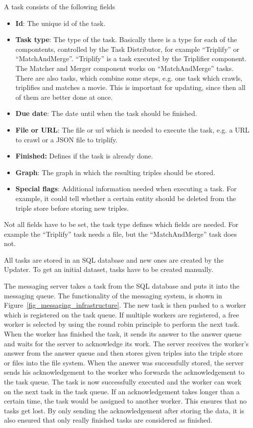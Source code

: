 A task consists of the following fields
\begin{itemize}
  \item \textbf{Id}:
  The unique id of the task.
  \item \textbf{Task type}:
   The type of the task.
  Basically there is a type for each of the compontents, controlled by the Task Distributor, for example ``Triplify'' or ``MatchAndMerge''.
  ``Triplify'' is a task executed by the Triplifier component.
  The Matcher and Merger component works on ``MatchAndMerge'' tasks.
  There are also tasks, which combine some steps, e.g. one task which crawls, triplifies and matches a movie. This is important for updating, since then all of them are better done at once.
  \item \textbf{Due date}:
  The date until when the task should be finished.
  \item \textbf{File or URL}:
  The file or url which is needed to execute the task, e.g. a URL to crawl or a JSON file to triplify.
  \item \textbf{Finished:}
  Defines if the task is already done.
  \item \textbf{Graph}:
  The graph in which the resulting triples should be stored.
  \item \textbf{Special flags}:
  Additional information needed when executing a task.
  For example, it could tell whether a certain entity should be deleted from the triple store before storing new triples.
\end{itemize}
Not all fields have to be set, the task type defines which fields are needed.
For example the ``Triplify'' task needs a file, but the ``MatchAndMerge'' task does not.

All tasks are stored in an SQL database and new ones are created by the Updater.
To get an initial dataset, tasks have to be created manually.

The messaging server takes a task from the SQL database and puts it into the messaging queue.
The functionality of the messaging system, is shown in Figure~\ref{fig_messaging_infrastructure}.
The new task is then pushed to a worker which is registered on the task queue.
If multiple workers are registered, a free worker is selected by using the round robin principle to perform the next task.
When the worker has finished the task, it sends its answer to the answer queue and waits for the server to acknowledge its work.
The server receives the worker's answer from the answer queue and then stores given triples into the triple store or files into the file system.
When the answer was successfully stored, the server sends his acknowledgement to the worker who forwards the acknowledgement to the task queue.
The task is now successfully executed and the worker can work on the next task in the task queue.
If an acknowledgement takes longer than a certain time, the task would be assigned to another worker.
This ensures that no tasks get lost.
By only sending the acknowledgement after storing the data, it is also ensured that only really finished tasks are considered as finished.

